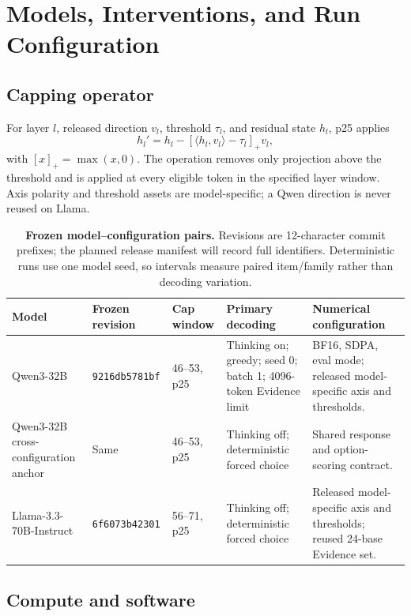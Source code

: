 \documentclass[letterpaper]{article}
\begin{document}
\section{Models, Interventions, and Run Configuration}
\label{supp:protocols}

\subsection{Capping operator}

For layer $l$, released direction $v_l$, threshold $\tau_l$, and residual state $h_l$, p25 applies
\begin{equation}
h_l' = h_l-\left[\langle h_l,v_l\rangle-\tau_l\right]_+v_l,
\end{equation}
with $[x]_+=\max(x,0)$.  The operation removes only projection above the threshold and is applied at every eligible token in the specified layer window.  Axis polarity and threshold assets are model-specific; a Qwen direction is never reused on Llama.

\begin{table}[t]
\centering
\scriptsize
\setlength{\tabcolsep}{3pt}
\renewcommand{\arraystretch}{1.12}
\begin{tabularx}{\textwidth}{@{}L{2.25cm}L{2.15cm}L{1.75cm}L{3.15cm}Y@{}}
\toprule
Model & Frozen revision & Cap window & Primary decoding & Numerical configuration \\
\midrule
Qwen3-32B & \texttt{9216db5781bf} & 46--53, p25 & Thinking on; greedy; seed 0; batch 1; 4096-token Evidence limit & BF16, SDPA, eval mode; released model-specific axis and thresholds. \\
Qwen3-32B cross-configuration anchor & Same & 46--53, p25 & Thinking off; deterministic forced choice & Shared response and option-scoring contract. \\
Llama-3.3-70B-Instruct & \texttt{6f6073b42301} & 56--71, p25 & Thinking off; deterministic forced choice & Released model-specific axis and thresholds; reused 24-base Evidence set. \\
\bottomrule
\end{tabularx}
\caption{\textbf{Frozen model--configuration pairs.} Revisions are 12-character commit prefixes; the planned release manifest will record full identifiers. Deterministic runs use one model seed, so intervals measure paired item/family rather than decoding variation.}
\label{tab:supp-models}
\end{table}

\subsection{Compute and software}
\end{document}
